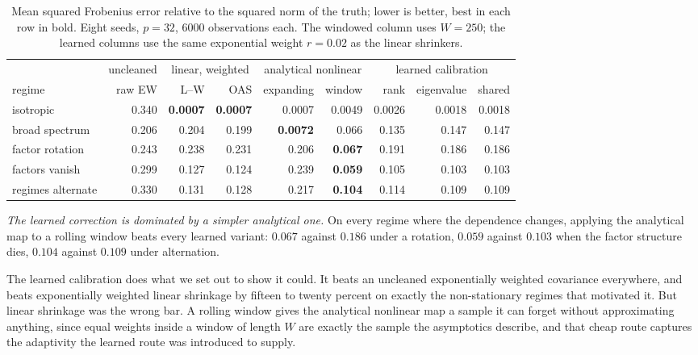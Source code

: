 \documentclass[11pt]{article}
\begin{document}
\begin{table}[ht]
\centering
\small
\begin{tabular}{lrrrrrrrr}
\toprule
 & uncleaned & \multicolumn{2}{c}{linear, weighted} & \multicolumn{2}{c}{analytical nonlinear} & \multicolumn{3}{c}{learned calibration} \\
\cmidrule(lr){2-2}\cmidrule(lr){3-4}\cmidrule(lr){5-6}\cmidrule(lr){7-9}
regime & raw EW & L--W & OAS & expanding & window & rank & eigenvalue & shared \\
\midrule
isotropic         & 0.340 & \textbf{0.0007} & \textbf{0.0007} & 0.0007          & 0.0049          & 0.0026 & 0.0018 & 0.0018 \\
broad spectrum    & 0.206 & 0.204           & 0.199           & \textbf{0.0072} & 0.066           & 0.135  & 0.147  & 0.147  \\
factor rotation   & 0.243 & 0.238           & 0.231           & 0.206           & \textbf{0.067}  & 0.191  & 0.186  & 0.186  \\
factors vanish    & 0.299 & 0.127           & 0.124           & 0.239           & \textbf{0.059}  & 0.105  & 0.103  & 0.103  \\
regimes alternate & 0.330 & 0.131           & 0.128           & 0.217           & \textbf{0.104}  & 0.114  & 0.109  & 0.109  \\
\bottomrule
\end{tabular}
\caption{Mean squared Frobenius error relative to the squared norm of the truth; lower is better,
best in each row in bold. Eight seeds, $p=32$, $6000$ observations each. The windowed
column uses $W=250$; the learned columns use the same exponential weight $r=0.02$ as the linear
shrinkers.}
\end{table}

\emph{The learned correction is dominated by a simpler analytical one.} On every regime where the
dependence changes, applying the analytical map to a rolling window beats every learned variant:
$0.067$ against $0.186$ under a rotation, $0.059$ against $0.103$ when the factor structure dies,
$0.104$ against $0.109$ under alternation.

The learned calibration does what we set out to show it could. It beats an uncleaned exponentially
weighted covariance everywhere, and beats exponentially weighted linear shrinkage by fifteen to
twenty percent on exactly the non-stationary regimes that motivated it. But linear shrinkage was the
wrong bar. A rolling window gives the analytical nonlinear map a sample it can forget without
approximating anything, since equal weights inside a window of length $W$ are exactly the sample the
asymptotics describe, and that cheap route captures the adaptivity the learned route was introduced
to supply.
\end{document}
